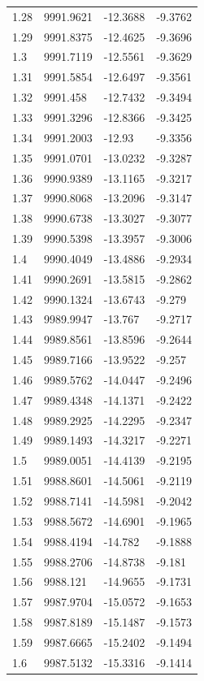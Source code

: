 \begin{table}[H]
\begin{tabular}{llll}
1.28 & 9991.9621 & -12.3688 & -9.3762 \\
1.29 & 9991.8375 & -12.4625 & -9.3696 \\
1.3 & 9991.7119 & -12.5561 & -9.3629 \\
1.31 & 9991.5854 & -12.6497 & -9.3561 \\
1.32 & 9991.458 & -12.7432 & -9.3494 \\
1.33 & 9991.3296 & -12.8366 & -9.3425 \\
1.34 & 9991.2003 & -12.93 & -9.3356 \\
1.35 & 9991.0701 & -13.0232 & -9.3287 \\
1.36 & 9990.9389 & -13.1165 & -9.3217 \\
1.37 & 9990.8068 & -13.2096 & -9.3147 \\
1.38 & 9990.6738 & -13.3027 & -9.3077 \\
1.39 & 9990.5398 & -13.3957 & -9.3006 \\
1.4 & 9990.4049 & -13.4886 & -9.2934 \\
1.41 & 9990.2691 & -13.5815 & -9.2862 \\
1.42 & 9990.1324 & -13.6743 & -9.279 \\
1.43 & 9989.9947 & -13.767 & -9.2717 \\
1.44 & 9989.8561 & -13.8596 & -9.2644 \\
1.45 & 9989.7166 & -13.9522 & -9.257 \\
1.46 & 9989.5762 & -14.0447 & -9.2496 \\
1.47 & 9989.4348 & -14.1371 & -9.2422 \\
1.48 & 9989.2925 & -14.2295 & -9.2347 \\
1.49 & 9989.1493 & -14.3217 & -9.2271 \\
1.5 & 9989.0051 & -14.4139 & -9.2195 \\
1.51 & 9988.8601 & -14.5061 & -9.2119 \\
1.52 & 9988.7141 & -14.5981 & -9.2042 \\
1.53 & 9988.5672 & -14.6901 & -9.1965 \\
1.54 & 9988.4194 & -14.782 & -9.1888 \\
1.55 & 9988.2706 & -14.8738 & -9.181 \\
1.56 & 9988.121 & -14.9655 & -9.1731 \\
1.57 & 9987.9704 & -15.0572 & -9.1653 \\
1.58 & 9987.8189 & -15.1487 & -9.1573 \\
1.59 & 9987.6665 & -15.2402 & -9.1494 \\
1.6 & 9987.5132 & -15.3316 & -9.1414 \\

\end{tabular}
\end{table}
